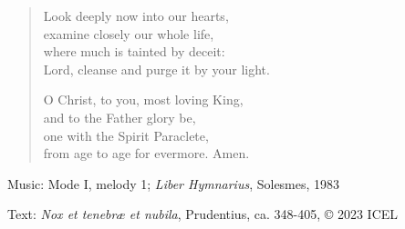 \hymn



\setlength{\vleftmargin}{2em}
\begin{verse}
Look deeply now into our hearts,\\
examine closely our whole life,\\
where much is tainted by deceit:\\
Lord, cleanse and purge it by your light.

O Christ, to you, most loving King,\\
and to the Father glory be,\\
one with the Spirit Paraclete,\\
from age to age for evermore. Amen.
\end{verse}

\begin{hymnsource}
Music: Mode I, melody 1; \emph{Liber Hymnarius}, Solesmes, 1983

Text: \emph{Nox et tenebræ et nubila}, Prudentius, ca. 348-405, © 2023 ICEL
\end{hymnsource}
